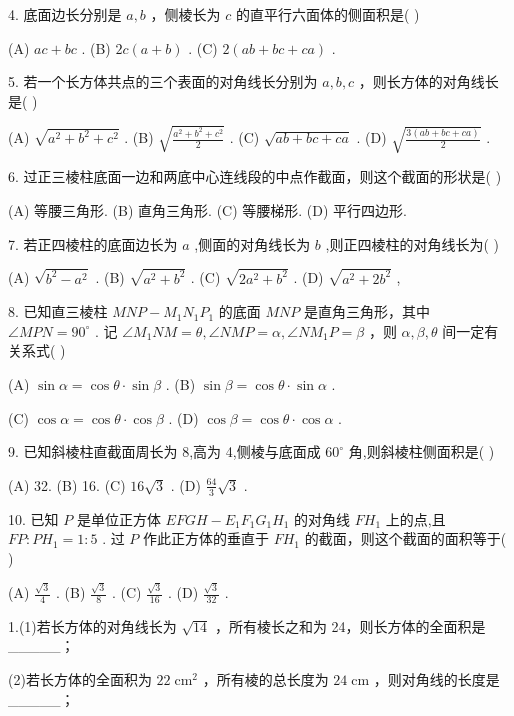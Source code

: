 \documentclass[10pt]{article}
\begin{document}
4. 底面边长分别是 \(a,b\) ，侧棱长为 \(c\) 的直平行六面体的侧面积是( )

(A) \({ac} + {bc}\) . (B) \({2c}\left( {a + b}\right)\) . (C) \(2\left( {{ab} + {bc} + {ca}}\right)\) .

5. 若一个长方体共点的三个表面的对角线长分别为 \(a,b,c\) ，则长方体的对角线长是( )

(A) \(\sqrt{{a}^{2} + {b}^{2} + {c}^{2}}\) . (B) \(\sqrt{\frac{{a}^{2} + {b}^{2} + {c}^{2}}{2}}\) . (C) \(\sqrt{{ab} + {bc} + {ca}}\) . (D) \(\sqrt{\frac{3\left( {{ab} + {bc} + {ca}}\right) }{2}}\) .

6. 过正三棱柱底面一边和两底中心连线段的中点作截面，则这个截面的形状是( )

(A) 等腰三角形. (B) 直角三角形. (C) 等腰梯形. (D) 平行四边形.

7. 若正四棱柱的底面边长为 \(a\) ,侧面的对角线长为 \(b\) ,则正四棱柱的对角线长为( )

(A) \(\sqrt{{b}^{2} - {a}^{2}}\) . (B) \(\sqrt{{a}^{2} + {b}^{2}}\) . (C) \(\sqrt{2{a}^{2} + {b}^{2}}\) . (D) \(\sqrt{{a}^{2} + 2{b}^{2}}\) ,

8. 已知直三棱柱 \({MNP} - {M}_{1}{N}_{1}{P}_{1}\) 的底面 \({MNP}\) 是直角三角形，其中 \({\angle {MPN}} = {90}^{ \circ  }\) . 记 \(\angle {M}_{1}{NM} = \theta ,\angle {NMP} = \alpha ,\angle N{M}_{1}P = \beta\) ，则 \(\alpha ,\beta ,\theta\) 间一定有关系式( )

(A) \(\sin \alpha  = \cos \theta  \cdot  \sin \beta\) . (B) \(\sin \beta  = \cos \theta  \cdot  \sin \alpha\) .

(C) \(\cos \alpha  = \cos \theta  \cdot  \cos \beta\) . (D) \(\cos \beta  = \cos \theta  \cdot  \cos \alpha\) .

9. 已知斜棱柱直截面周长为 8,高为 4,侧棱与底面成 \({60}^{ \circ  }\) 角,则斜棱柱侧面积是( )

(A) 32. (B) 16. (C) \({16}\sqrt{3}\) . (D) \(\frac{64}{3}\sqrt{3}\) .

10. 已知 \(P\) 是单位正方体 \({EFGH} - {E}_{1}{F}_{1}{G}_{1}{H}_{1}\) 的对角线 \(F{H}_{1}\) 上的点,且 \({FP} : P{H}_{1} = 1 : 5\) . 过 \(P\) 作此正方体的垂直于 \(F{H}_{1}\) 的截面，则这个截面的面积等于( )

(A) \(\frac{\sqrt{3}}{4}\) . (B) \(\frac{\sqrt{3}}{8}\) . (C) \(\frac{\sqrt{3}}{16}\) . (D) \(\frac{\sqrt{3}}{32}\) .

1.(1)若长方体的对角线长为 \(\sqrt{14}\) ，所有棱长之和为 24，则长方体的全面积是\_\_\_\_\_；

(2)若长方体的全面积为 \({22}{\mathrm{\;{cm}}}^{2}\) ，所有棱的总长度为 \({24}\mathrm{\;{cm}}\) ，则对角线的长度是\_\_\_\_\_；
\end{document}
